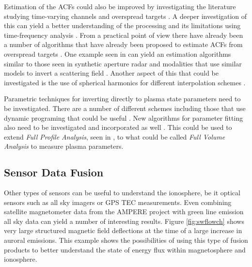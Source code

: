 Estimation of the ACFs could also be improved by investigating the literature studying time-varying channels and overspread targets \citep{Kailath:1962jx,Kailath:1963gh,Pfander:2006hh,Pfander:2015ea}. A deeper investigation of this can yield a better understanding of the processing and its limitations using time-frequency analysis \citep{TFAcohen,Peyrin:1986bh,Jiang:kj}. From a practical point of view there have already been a number of algorithms that have already been proposed to estimate ACFs from overspread targets \citep{Pfander:2015ea,Jiang:kj}. One example seen in \citet{Kay:2003jl} can yield an estimation algorithms similar to those seen in synthetic aperture radar and modalities that use similar models to invert a scattering field \citep{1456966,Ralston:2007hs,richards2014fundamentals}. Another aspect of this that could be investigated is the use of spherical harmonics for different interpolation schemes \citep{Baddour:2010cq,Baddour:2009jm,Baddour:2012bd}.

Parametric techniques for inverting directly to plasma state parameters need to be investigated. There are a number of different schemes including those that use dynamic programing that could be useful \citep{Yau:1992kd,Yau:1993kf,Oktem:2014ju}. New algorithms for parameter fitting also need to be investigated and incorporated as well \citep{Shpynev:2010co}. This could be used to extend \textit{Full Profile Analysis}, seen in \citet{RDS:RDS3308,hysell2008}, to what could be called \textit{Full Volume Analysis} to measure plasma parameters.

\subsection{Sensor Data Fusion}

Other types of sensors can be useful to understand the ionosphere, be it optical sensors such as all sky imagers or GPS TEC measurements. Even combining satellite magnetometer data from the AMPERE project \citep{Anderson:2000uh,Anderson:2014hf} with green line emission all sky data can yield a number of interesting results. Figure \ref{fig:swflowch} shows very large structured magnetic field deflections at the time of a large increase in auroral emissions. This example shows the possibilities of using this type of fusion products to better understand the state of energy flux within magnetosphere and ionosphere.

